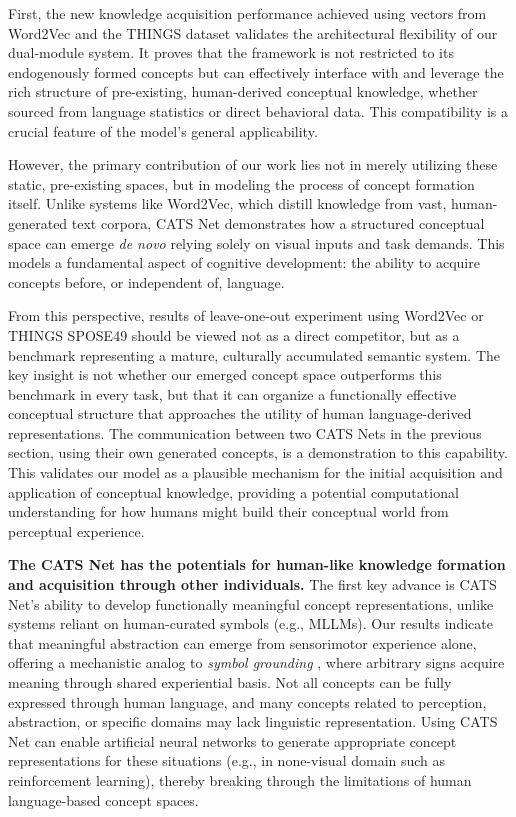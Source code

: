 \documentclass[pdflatex,sn-mathphys-num,lineno]{sn-jnl}%
\begin{document}
\begin{CJK}{UTF8}{gbsn}
First, the new knowledge acquisition performance achieved using vectors from Word2Vec and the THINGS dataset validates the architectural flexibility of our dual-module system. It proves that the framework is not restricted to its endogenously formed concepts but can effectively interface with and leverage the rich structure of pre-existing, human-derived conceptual knowledge, whether sourced from language statistics or direct behavioral data. This compatibility is a crucial feature of the model's general applicability.

However, the primary contribution of our work lies not in merely utilizing these static, pre-existing spaces, but in modeling the process of concept formation itself. Unlike systems like Word2Vec, which distill knowledge from vast, human-generated text corpora, CATS Net demonstrates how a structured conceptual space can emerge \textit{de novo} relying solely on visual inputs and task demands. This models a fundamental aspect of cognitive development: the ability to acquire concepts before, or independent of, language.

From this perspective, results of leave-one-out experiment using Word2Vec or THINGS SPOSE49 should be viewed not as a direct competitor, but as a benchmark representing a mature, culturally accumulated semantic system. The key insight is not whether our emerged concept space outperforms this benchmark in every task, but that it can organize a functionally effective conceptual structure that approaches the utility of human language-derived representations. The communication between two CATS Nets in the previous section, using their own generated concepts, is a demonstration to this capability. This validates our model as a plausible mechanism for the initial acquisition and application of conceptual knowledge, providing a potential computational understanding for how humans might build their conceptual world from perceptual experience.

\textbf{The CATS Net has the potentials for human-like knowledge formation and acquisition through other individuals.} The first key advance is CATS Net's ability to develop functionally meaningful concept representations, unlike systems reliant on human-curated symbols (e.g., MLLMs). Our results indicate that meaningful abstraction can emerge from sensorimotor experience alone, offering a mechanistic analog to \textit{symbol grounding} \cite{harnad_symbol_1990}, where arbitrary signs acquire meaning through shared experiential basis. Not all concepts can be fully expressed through human language, and many concepts related to perception, abstraction, or specific domains may lack linguistic representation. Using CATS Net can enable artificial neural networks to generate appropriate concept representations for these situations (e.g., in none-visual domain such as reinforcement learning), thereby breaking through the limitations of human language-based concept spaces.


\end{CJK}
\end{document}
